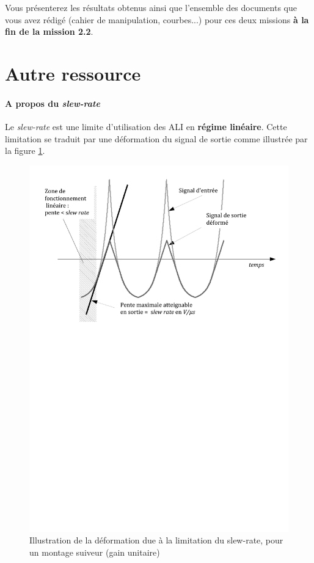 Vous présenterez les résultats obtenus ainsi que l'ensemble des documents que vous avez rédigé (cahier de manipulation, courbes...) pour ces deux missions \textbf{à la fin de la mission 2.2}.

\newpage
\section{Autre ressource}
\label{parslewrate}

\paragraph{A propos du \textit{slew-rate} } Le \textit{slew-rate}  est une limite d'utilisation des ALI en \textbf{régime linéaire}. Cette limitation se traduit par une déformation du signal de sortie comme illustrée par la figure \ref{fig_SlewRate2}.


\begin{figure}[!h]
\centering
\includegraphics[scale=0.6]{images/SlewRate.pdf}
\caption{Illustration de la déformation due à la limitation du slew-rate, pour un montage suiveur (gain unitaire)}  \label{fig_SlewRate2} 
\end{figure}

